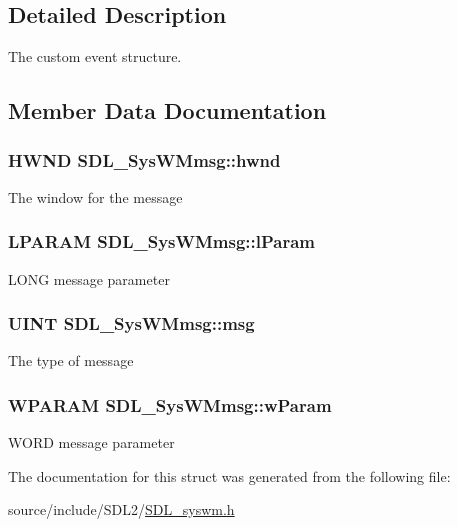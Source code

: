 \subsection{Detailed Description}
The custom event structure. 

\subsection{Member Data Documentation}
\hypertarget{struct_s_d_l___sys_w_mmsg_a55cf9583b5eddfe60a5c9851f9cce457}{}
\subsubsection[{hwnd}]{\setlength{\rightskip}{0pt plus 5cm}H\+W\+N\+D S\+D\+L\+\_\+\+Sys\+W\+Mmsg\+::hwnd}\label{struct_s_d_l___sys_w_mmsg_a55cf9583b5eddfe60a5c9851f9cce457}
The window for the message \hypertarget{struct_s_d_l___sys_w_mmsg_a24c1e4c3cb8d9781d34e5d99df66ac36}{}
\subsubsection[{l\+Param}]{\setlength{\rightskip}{0pt plus 5cm}L\+P\+A\+R\+A\+M S\+D\+L\+\_\+\+Sys\+W\+Mmsg\+::l\+Param}\label{struct_s_d_l___sys_w_mmsg_a24c1e4c3cb8d9781d34e5d99df66ac36}
L\+O\+N\+G message parameter \hypertarget{struct_s_d_l___sys_w_mmsg_a74894ed060d5508ab06aac584154d61e}{}
\subsubsection[{msg}]{\setlength{\rightskip}{0pt plus 5cm}U\+I\+N\+T S\+D\+L\+\_\+\+Sys\+W\+Mmsg\+::msg}\label{struct_s_d_l___sys_w_mmsg_a74894ed060d5508ab06aac584154d61e}
The type of message \hypertarget{struct_s_d_l___sys_w_mmsg_a7463730478d90ebc031d83098f3f74fc}{}
\subsubsection[{w\+Param}]{\setlength{\rightskip}{0pt plus 5cm}W\+P\+A\+R\+A\+M S\+D\+L\+\_\+\+Sys\+W\+Mmsg\+::w\+Param}\label{struct_s_d_l___sys_w_mmsg_a7463730478d90ebc031d83098f3f74fc}
W\+O\+R\+D message parameter 

The documentation for this struct was generated from the following file\+:\begin{DoxyCompactItemize}
\item 
source/include/\+S\+D\+L2/\hyperlink{_s_d_l__syswm_8h}{S\+D\+L\+\_\+syswm.\+h}\end{DoxyCompactItemize}
